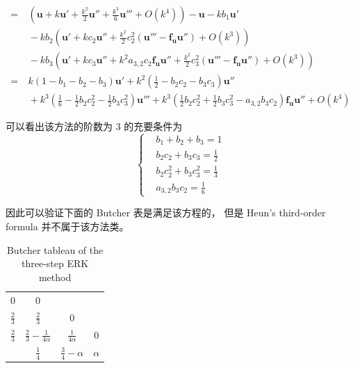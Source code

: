 \documentclass[a4paper]{article}
\begin{document}
\begin{equation}
\begin{aligned}
        =&\ \left(
            \mathbf{u}+k\mathbf{u}'+\frac{k^2}{2}\mathbf{u}''+\frac{k^3}{6}\mathbf{u}'''
            +O(k^4)
        \right)-\mathbf{u}
        -k b_1\mathbf{u}'\\
        &\ -k b_2\left(
            \mathbf{u}'+k c_2\mathbf{u}''
            +\frac{k^2}{2}c_2^2 (\mathbf{u}'''-\mathbf{f}_{\mathbf{u}}\mathbf{u}'')
            + O(k^3)
        \right)\\
        &\ -k b_3\left(
            \mathbf{u}'
            +k c_3\mathbf{u}''
            +k^2 a_{3,2} c_2 \mathbf{f}_{\mathbf{u}}\mathbf{u}''
            +\frac{k^2}{2} c_3^2 (\mathbf{u}'''-\mathbf{f}_{\mathbf{u}}\mathbf{u}'')
            + O(k^3)
        \right)\\
        =&\ k\left(
            1 - b_1 - b_2 - b_3
        \right)\mathbf{u}'
        +k^2\left(
            \frac{1}{2} - b_2 c_2 - b_3 c_3
        \right)\mathbf{u}''\\
        &\ +k^3\left(
            \frac{1}{6} - \frac{1}{2}b_2c_2^2 - \frac{1}{2}b_3 c_3^2
        \right)\mathbf{u}'''
        + k^3 \left(
            \frac{1}{2}b_2 c_2^2+\frac{1}{2}b_3 c_3^2 - a_{3,2}b_3c_2
        \right)\mathbf{f}_{\mathbf{u}}\mathbf{u}''
        + O(k^4)
    \end{aligned}
\end{equation}
\par 可以看出该方法的阶数为 3 的充要条件为
\begin{equation}
    \left\{
        \begin{aligned}
            &b_1 + b_2 + b_3 = 1\\
            &b_2 c_2 + b_3 c_3 = \frac{1}{2}\\
            &b_2 c_2^2 + b_3 c_3^2 = \frac{1}{3}\\
            &a_{3,2}b_3c_2 = \frac{1}{6}
        \end{aligned}
    \right.
\end{equation}
\par 因此可以验证下面的 Butcher 表是满足该方程的，
但是 Heun's third-order formula 并不属于该方法类。
\begin{table}[htbp]
    \centering
    \caption{Butcher tableau of the three-step ERK method}
    \begin{tabular}{c|ccc}
        0 & 0 & ~ & ~\\
        $\frac{2}{3}$ & $\frac{2}{3}$ & 0 & ~\\
        $\frac{2}{3}$ & $\frac{2}{3}-\frac{1}{4\alpha}$ & $\frac{1}{4\alpha}$ & 0\\
        \hline
        ~ & $\frac{1}{4}$ & $\frac{3}{4}-\alpha$ & $\alpha$\\
    \end{tabular}
\end{table}
\end{document}
